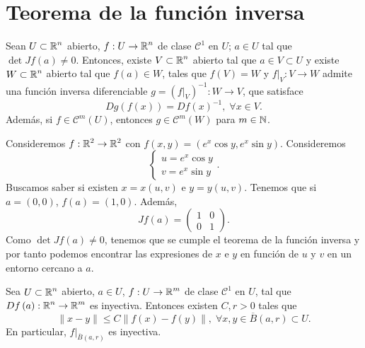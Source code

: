 \section{Teorema de la función inversa}
\begin{theorem}
Sean $\displaystyle U \subset \mathbb{R}^{n} $ abierto, $\displaystyle f : U \to \mathbb{R}^{n} $ de clase $\displaystyle \mathcal{C}^{1} $ en $\displaystyle U $; $\displaystyle a\in U $ tal que $\displaystyle \det Jf\left(a\right) \neq 0 $. Entonces, existe $\displaystyle V \subset \mathbb{R}^{n} $ abierto tal que $\displaystyle a \in V \subset U $ y existe $\displaystyle W \subset \mathbb{R}^{n} $ abierto tal que $\displaystyle f\left(a\right) \in W $, tales que $\displaystyle f\left(V\right) = W $ y $\displaystyle f|_{V} : V \to W $ admite una función inversa diferenciable $\displaystyle g = \left(f|_{V}\right)^{-1} : W \to V $, que satisface 
\[Dg\left(f\left(x\right)\right) = Df\left(x\right)^{-1}, \; \forall x \in V .\]
Además, si $\displaystyle f \in \mathcal{C}^{m}\left(U\right) $, entonces $\displaystyle g \in \mathcal{C}^{m}\left(W\right) $ para $\displaystyle m \in \mathbb{N} $.
\end{theorem}
\begin{eg}
Consideremos $\displaystyle f : \mathbb{R}^{2} \to \mathbb{R}^{2} $ con $\displaystyle f\left(x,y\right) = \left(e^{x}\cos y, e^{x}\sin y\right) $. Consideremos 
\[
\begin{cases}
u = e^{x}\cos y \\
v = e^{x} \sin y
\end{cases}
.\]
Buscamos saber si existen $\displaystyle x = x\left(u,v\right) $ e $\displaystyle y = y\left(u,v\right) $. Tenemos que si $\displaystyle a = \left(0,0\right) $, $\displaystyle f\left(a\right) = \left(1,0\right) $. Además, 
\[ Jf\left(a\right) = \begin{pmatrix} 1 & 0 \\ 0 & 1 \end{pmatrix} .\]
Como $\displaystyle \det Jf\left(a\right) \neq 0 $, tenemos que se cumple el teorema de la función inversa y por tanto podemos encontrar las expresiones de $\displaystyle x $ e $\displaystyle y $ en función de $\displaystyle u $ y $\displaystyle v $ en un entorno cercano a $\displaystyle a $. 
\end{eg}
\begin{theorem}
Sea $\displaystyle U \subset \mathbb{R}^{n} $ abierto, $\displaystyle a \in U $, $\displaystyle f : U \to \mathbb{R}^{m} $ de clase $\displaystyle \mathcal{C}^{1} $ en $\displaystyle U $, tal que $\displaystyle Df\left(a\right) : \mathbb{R}^{n} \to \mathbb{R}^{m} $ es inyectiva. Entonces existen $\displaystyle C,r > 0 $ tales que 
\[ \|x-y\| \leq C \|f\left(x\right)-f\left(y\right) \|, \; \forall x,y \in \overline{B}\left(a,r\right) \subset U .\]
En particular, $\displaystyle f|_{\overline{B}\left(a,r\right)} $ es inyectiva. 
\end{theorem}
